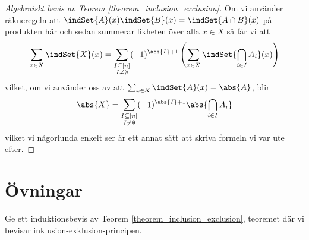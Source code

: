 \documentclass[nobib]{tufte-handout}
\begin{document}
\begin{proof}[Algebraiskt bevis av Teorem \ref{theorem_inclusion_exclusion}]
  Om vi använder räkneregeln att $\indSet{A}(x)\indSet{B}(x) = \indSet{A\cap B}(x)$ på produkten här och sedan summerar likheten över alla $x\in X$ så får vi att
  $$\sum_{x\in X} \indSet{X}(x) = \sum_{\substack{I \subseteq [n]\\I \neq \emptyset}} (-1)^{\abs{I} + 1}\left(\sum_{x\in X} \indSet{\bigcap_{i\in I} A_i}(x)\right)$$
  vilket, om vi använder oss av att $\sum_{x\in X} \indSet{A}(x) = \abs{A}$, blir
  $$\abs{X} = \sum_{\substack{I \subseteq [n]\\I \neq \emptyset}} (-1)^{\abs{I} + 1}\abs{\bigcap_{i\in I} A_i}$$
  vilket vi någorlunda enkelt ser är ett annat sätt att skriva formeln vi var ute efter.
\end{proof}

\section{Övningar}

\begin{xca}
  Ge ett induktionsbevis av Teorem \ref{theorem_inclusion_exclusion}, teoremet där vi bevisar inklusion-exklusion-principen.
\end{xca}

%
%
\end{document}
